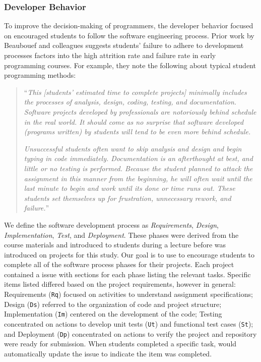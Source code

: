 \subsubsection{Developer Behavior}

To improve the decision-making of programmers, the developer behavior \tooltwo focused on encouraged students to follow the software engineering process. Prior work by Beaubouef and colleagues suggests students' failure to adhere to development processes factors into the high attrition rate and failure rate in early programming courses. For example, they note the following about typical student programming methods:

\begin{quote}
``\textit{This [students' estimated time to complete projects] minimally includes the processes of analysis, design, coding, testing, and documentation. Software projects developed by professionals are notoriously behind schedule in the real world. It should come as no surprise that software developed (programs written) by students will tend to be even more behind schedule.} 

\textit{Unsuccessful students often want to skip analysis and design and begin typing in code immediately. Documentation is an afterthought at best, and little or  no testing is performed. Because the student planned to attack the assignment in this manner from the beginning, he will often wait until the last minute to begin and work until its done or time runs out. These students set themselves up for frustration, unnecessary rework, and failure.}''~\citep[p.~105]{beaubouef2005high}
\end{quote}

We define the software development process as \textit{Requirements}, \textit{Design}, \textit{Implementation}, \textit{Test}, and \textit{Deployment}. These phases were derived from the course materials and introduced to students during a lecture before \tooltwo was introduced on projects for this study. Our goal is to use \framework to encourage students to complete all of the software process phases for their projects. Each project contained a \tooltwo issue with sections for each phase listing the relevant tasks. Specific items listed differed based on the project requirements, however in general: Requirements (\texttt{Rq}) focused on activities to understand assignment specifications; Design (\texttt{Ds}) referred to the organization of code and project structure; Implementation (\texttt{Im}) centered on the development of the code; Testing concentrated on actions to develop unit tests (\texttt{Ut}) and functional test cases (\texttt{St}); and Deployment (\texttt{Dp}) concentrated on actions to verify the project and repository were ready for submission. When students completed a specific task, \tooltwo would automatically update the issue to indicate the item was completed.

